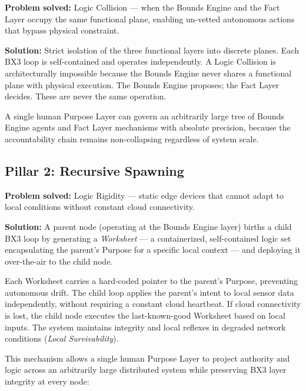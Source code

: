 \documentclass[12pt]{article}
\begin{document}
\textbf{Problem solved:} Logic Collision --- when the Bounds Engine and the Fact Layer occupy the same functional plane, enabling un-vetted autonomous actions that bypass physical constraint.

\textbf{Solution:} Strict isolation of the three functional layers into discrete planes. Each BX3 loop is self-contained and operates independently. A Logic Collision is architecturally impossible because the Bounds Engine never shares a functional plane with physical execution. The Bounds Engine proposes; the Fact Layer decides. These are never the same operation.

A single human Purpose Layer can govern an arbitrarily large tree of Bounds Engine agents and Fact Layer mechanisms with absolute precision, because the accountability chain remains non-collapsing regardless of system scale.

\subsection{Pillar 2: Recursive Spawning}

\textbf{Problem solved:} Logic Rigidity --- static edge devices that cannot adapt to local conditions without constant cloud connectivity.

\textbf{Solution:} A parent node (operating at the Bounds Engine layer) births a child BX3 loop by generating a \textit{Worksheet} --- a containerized, self-contained logic set encapsulating the parent's Purpose for a specific local context --- and deploying it over-the-air to the child node.

Each Worksheet carries a hard-coded pointer to the parent's Purpose, preventing autonomous drift. The child loop applies the parent's intent to local sensor data independently, without requiring a constant cloud heartbeat. If cloud connectivity is lost, the child node executes the last-known-good Worksheet based on local inputs. The system maintains integrity and local reflexes in degraded network conditions (\textit{Local Survivability}).

This mechanism allows a single human Purpose Layer to project authority and logic across an arbitrarily large distributed system while preserving BX3 layer integrity at every node:
\end{document}
